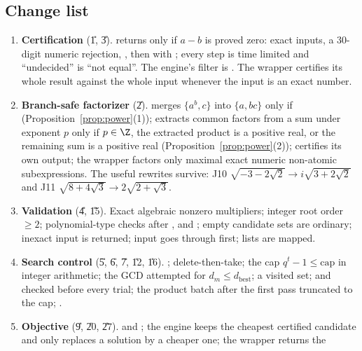 \subsection{Change list}
\begin{enumerate}[label=\arabic*.]
\item \textbf{Certification} (\U{1}, \U{3}). 
      returns  only if $a-b$ is proved zero: exact inputs, a
      30-digit numeric rejection, , then
       with ; every step
      is time limited and ``undecided'' is ``not equal''. The engine's filter
      is . The
      wrapper certifies its whole result against the whole input whenever the
      input is an exact number.
\item \textbf{Branch-safe factorizer} (\U{2}).  merges
      $\{a^b,c\}$ into $\{a,bc\}$ only if 
      (Proposition~\ref{prop:power}(1));  extracts common factors
      from a sum under exponent $p$ only if $p\in\Z$, the extracted product is
      a positive real, or the remaining sum is a positive real
      (Proposition~\ref{prop:power}(2));  certifies its own
      output; the wrapper factors only maximal exact numeric non-atomic
      subexpressions. The useful rewrites survive: J10
      $\sqrt{-3-2\sqrt2}\to i\sqrt{3+2\sqrt2}$ and J11 $\sqrt{8+4\sqrt3}\to2\sqrt{2+\sqrt3}$.
\item \textbf{Validation} (\U{4}, \U{15}). Exact algebraic nonzero multipliers;
      integer root order $\ge2$; polynomial-type checks after
      ,  and ; empty
      candidate sets are ordinary; inexact input is returned; 
      input goes through  first; lists are mapped.
\item \textbf{Search control} (\U{5}, \U{6}, \U{7}, \U{12}, \U{16}).
      ; delete-then-take; the cap
      $q^t-1\le\text{cap}$ in integer arithmetic; the GCD attempted for
      $d_m\le d_{\text{best}}$; a visited set;  and
       checked before every trial; the product batch after
      the first pass truncated to the cap; .
\item \textbf{Objective} (\U{9}, \U{20}, \U{27}).  and
      ; the engine keeps the cheapest certified candidate and
      only replaces a solution by a cheaper one; the wrapper returns the

\end{enumerate}
